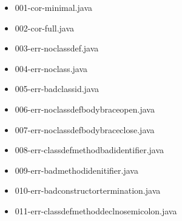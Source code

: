 \documentclass [a4paper,titlepage]{report}
\begin{document}
\begin{itemize}
\item 001-cor-minimal.java
\item 002-cor-full.java
\item 003-err-noclassdef.java
\item 004-err-noclass.java
\item 005-err-badclassid.java
\item 006-err-noclassdefbodybraceopen.java
\item 007-err-noclassdefbodybraceclose.java
\item 008-err-classdefmethodbadidentifier.java
\item 009-err-badmethodidenitifier.java
\item 010-err-badconstructortermination.java
\item 011-err-classdefmethoddeclnosemicolon.java
\end{itemize}
\end{document}
